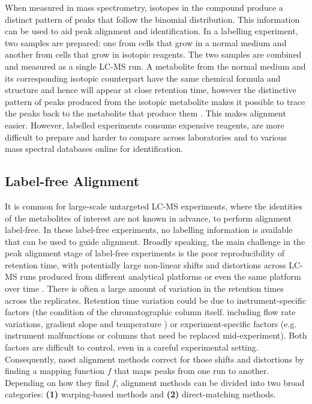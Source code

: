 When measured in mass spectrometry, isotopes in the compound produce a distinct pattern of peaks that follow the binomial distribution. This information can be used to aid peak alignment and identification. In a labelling experiment, two samples are prepared: one from cells that grow in a normal medium and another from cells that grow in isotopic reagents. The two samples are combined and measured as a single LC-MS run. A metabolite from the normal medium and its corresponding isotopic counterpart have the same chemical formula and structure and hence will appear at close retention time, however the distinctive pattern of peaks produced from the isotopic metabolite makes it possible to trace the peaks back to the metabolite that produce them \cite{chokkathukalam2014stable}. This makes alignment easier. However, labelled experiments consume expensive reagents, are more difficult to prepare and harder to compare across laboratories and to various mass spectral databases online for identification. 

\subsection{Label-free Alignment}

It is common for large-scale untargeted LC-MS experiments, where the identities of the metabolites of interest are not known in advance, to perform alignment label-free. In these label-free experiments, no labelling information is available that can be used to guide alignment. Broadly speaking, the main challenge in the peak alignment stage of label-free experiments is the poor reproducibility of retention time, with potentially large non-linear shifts and distortions across LC-MS runs produced from different analytical platforms or even the same platform over time \cite{Podwojski2009}. There is often a large amount of variation in the retention times across the replicates. Retention time variation could be due to instrument-specific factors (the condition of the chromatographic column itself. including flow rate variations, gradient slope and temperature \cite{Christin2008}) or experiment-specific factors (e.g. instrument malfunctions or columns that need be replaced mid-experiment). Both factors are difficult to control, even in a careful experimental setting. Consequently, most alignment methods correct for those shifts and distortions by finding a mapping function $f$ that maps peaks from one run to another. Depending on how they find $f$, alignment methods can be divided into two broad categories: \textbf{(1)} warping-based methods and \textbf{(2)} direct-matching methods.

